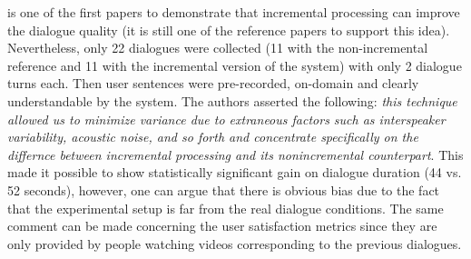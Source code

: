         \cite{Aist2007} is one of the first papers to demonstrate that incremental processing can improve the dialogue quality (it is still one of the reference papers to support this idea). Nevertheless, only 22 dialogues were collected (11 with the non-incremental reference and 11 with the incremental version of the system) with only 2 dialogue turns each. Then user sentences were pre-recorded, on-domain and clearly understandable by the system. The authors asserted the following: \textit{this technique allowed us to minimize variance due to extraneous factors such as interspeaker variability, acoustic noise, and so forth and concentrate specifically on the differnce between incremental processing and its nonincremental counterpart}. This made it possible to show statistically significant gain on dialogue duration (44 vs. 52 seconds), however, one can argue that there is obvious bias due to the fact that the experimental setup is far from the real dialogue conditions. The same comment can be made concerning the user satisfaction metrics since they are only provided by people watching videos corresponding to the previous dialogues.
